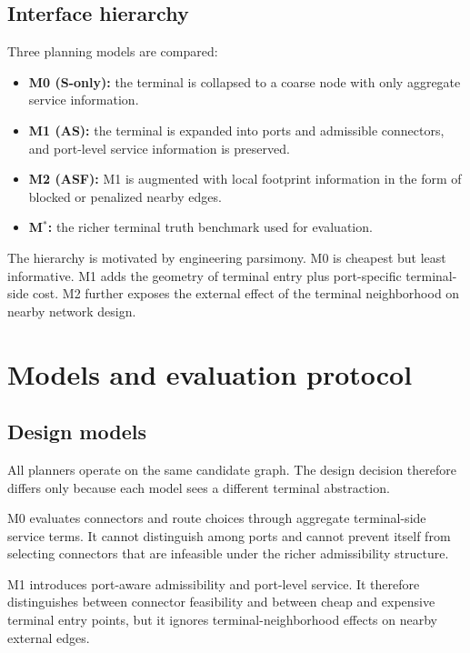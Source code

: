 \documentclass[review,authoryear]{elsarticle}
\begin{document}
\subsection{Interface hierarchy}
\label{sec:problem:hierarchy}

Three planning models are compared:
\begin{itemize}
  \item \textbf{M0 (S-only):} the terminal is collapsed to a coarse node with only aggregate service information.
  \item \textbf{M1 (AS):} the terminal is expanded into ports and admissible connectors, and port-level service information is preserved.
  \item \textbf{M2 (ASF):} M1 is augmented with local footprint information in the form of blocked or penalized nearby edges.
  \item \textbf{M$^*$:} the richer terminal truth benchmark used for evaluation.
\end{itemize}

The hierarchy is motivated by engineering parsimony. M0 is cheapest but least informative. M1 adds the geometry of terminal entry plus port-specific terminal-side cost. M2 further exposes the external effect of the terminal neighborhood on nearby network design.


\section{Models and evaluation protocol}
\label{sec:models}

\subsection{Design models}
\label{sec:models:design}

All planners operate on the same candidate graph. The design decision therefore differs only because each model sees a different terminal abstraction.

M0 evaluates connectors and route choices through aggregate terminal-side service terms. It cannot distinguish among ports and cannot prevent itself from selecting connectors that are infeasible under the richer admissibility structure.

M1 introduces port-aware admissibility and port-level service. It therefore distinguishes between connector feasibility and between cheap and expensive terminal entry points, but it ignores terminal-neighborhood effects on nearby external edges.
\end{document}
